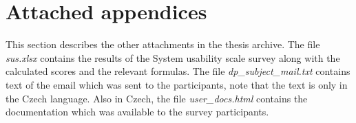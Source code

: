 \documentclass[nolof,digital]{fithesis3}
\begin{document}
\section{Attached appendices}
This section describes the other attachments in the thesis archive. The file \emph{sus.xlsx} contains the results of the System usability scale survey along with the calculated scores and the relevant formulas. The file \emph{dp\_subject\_mail.txt} contains text of the email which was sent to the participants, note that the text is only in the Czech language. Also in Czech, the file \emph{user\_docs.html} contains the documentation which was available to the survey participants.
\end{document}
